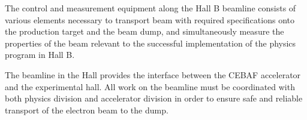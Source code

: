 

The control and measurement equipment along the Hall B beamline consists of various elements necessary to transport beam with required specifications onto the production target and the beam dump, and simultaneously measure the properties of the beam relevant to the successful implementation of the physics program in Hall B. 

The beamline in the Hall provides the interface between the CEBAF accelerator and the experimental hall. All work on the beamline must be coordinated with both physics division and accelerator division in order to ensure safe and reliable transport of the electron beam to the dump.

